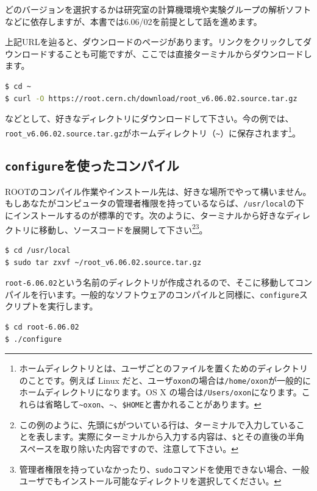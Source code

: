 どのバージョンを選択するかは研究室の計算機環境や実験グループの解析ソフトなどに依存しますが、本書では6.06/02を前提として話を進めます。

上記URLを辿ると、ダウンロードのページがあります。リンクをクリックしてダウンロードすることも可能ですが、ここでは直接ターミナルからダウンロードします。
\begin{lstlisting}[language=bash]
$ cd ~
$ curl -O https://root.cern.ch/download/root_v6.06.02.source.tar.gz
\end{lstlisting}
などとして、好きなディレクトリにダウンロードして下さい。今の例では、\texttt{root\_v6.06.02.source.tar.gz}がホームディレクトリ（\texttt{\~}）に保存されます\footnote{ホームディレクトリとは、ユーザごとのファイルを置くためのディレクトリのことです。例えば Linux だと、ユーザ\texttt{oxon}の場合は\texttt{/home/oxon}が一般的にホームディレクトリになります。OS X の場合は\texttt{/Users/oxon}になります。これらは省略して\texttt{{\textasciitilde}oxon}、\texttt{\textasciitilde}、\texttt{\$HOME}と書かれることがあります。}。

\subsection{\texttt{configure}を使ったコンパイル}
\label{subsec_compile_configure}
ROOTのコンパイル作業やインストール先は、好きな場所でやって構いません。もしあなたがコンピュータの管理者権限を持っているならば、\texttt{/usr/local}の下にインストールするのが標準的です。次のように、ターミナルから好きなディレクトリに移動し、ソースコードを展開して下さい\footnote{この例のように、先頭に\texttt{\$}がついている行は、ターミナルで入力していることを表します。実際にターミナルから入力する内容は、\texttt{\$}とその直後の半角スペースを取り除いた内容ですので、注意して下さい。}\footnote{管理者権限を持っていなかったり、\texttt{sudo}コマンドを使用できない場合、一般ユーザでもインストール可能なディレクトリを選択してください。}。
\begin{lstlisting}[language=bash]
$ cd /usr/local
$ sudo tar zxvf ~/root_v6.06.02.source.tar.gz
\end{lstlisting}

\texttt{root-6.06.02}という名前のディレクトリが作成されるので、そこに移動してコンパイルを行います。一般的なソフトウェアのコンパイルと同様に、\texttt{configure}スクリプトを実行します。

\begin{lstlisting}[language=bash]
$ cd root-6.06.02
$ ./configure
\end{lstlisting}

